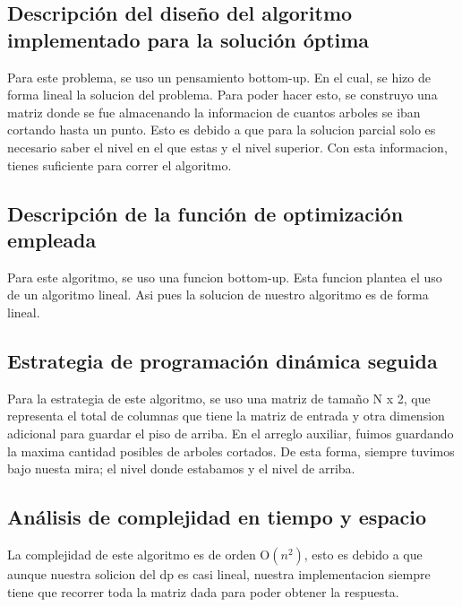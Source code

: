 \documentclass[a4paper,10pt]{article}
\begin{document}
  \subsection{Descripción del diseño del algoritmo implementado para la solución óptima}
  \hspace{2cm}
Para este problema, se uso un pensamiento bottom-up. En el cual, se hizo de forma lineal la solucion del problema. Para poder hacer esto, se construyo una matriz donde se fue almacenando la informacion de cuantos arboles se iban cortando hasta un punto. Esto es debido a que para la solucion parcial solo es necesario saber el nivel en el que estas y el nivel superior. Con esta informacion, tienes suficiente para correr el algoritmo.
  \subsection{Descripción de la función de optimización empleada}
  \hspace{2cm}
Para este algoritmo, se uso una funcion bottom-up. Esta funcion plantea el uso de un algoritmo lineal. Asi pues la solucion de nuestro algoritmo es de forma lineal. 
  \subsection{Estrategia de programación dinámica seguida}
  \hspace{2cm}
Para la estrategia de este algoritmo, se uso una matriz de tamaño N x 2, que representa el total de columnas que tiene la matriz de entrada y otra dimension adicional para guardar el piso de arriba.
En el arreglo auxiliar, fuimos guardando la maxima cantidad posibles de arboles cortados. De esta forma, siempre tuvimos bajo nuesta mira; el nivel donde estabamos y el nivel de arriba.
  \subsection{Análisis de complejidad en tiempo y espacio}
  \hspace{2cm}
La complejidad de este algoritmo es de orden O$(n^2)$, esto es debido a que aunque nuestra solicion del dp es casi lineal, nuestra implementacion siempre tiene que recorrer toda la matriz dada para poder obtener la respuesta. 
  
  
\end{document}
